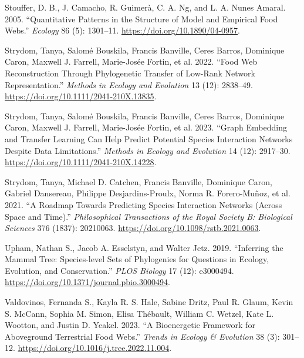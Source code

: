 \documentclass[
  letterpaper,
  DIV=11,
  numbers=noendperiod]{scrartcl}
\newlength{\cslhangindent}
\newenvironment{CSLReferences}[2] %
 {\begin{list}{}{%
  \setlength{\itemindent}{0pt}
  \setlength{\leftmargin}{0pt}
  \setlength{\parsep}{0pt}
  \ifodd #1
   \setlength{\leftmargin}{\cslhangindent}
   \setlength{\itemindent}{-1\cslhangindent}
  \fi
  \setlength{\itemsep}{#2\baselineskip}}}
 {\end{list}}
\begin{document}
\begin{CSLReferences}{1}{0}
Stouffer, D. B., J. Camacho, R. Guimerà, C. A. Ng, and L. A. Nunes
Amaral. 2005. {``Quantitative {Patterns} in the {Structure} of {Model}
and {Empirical Food Webs}.''} \emph{Ecology} 86 (5): 1301--11.
\url{https://doi.org/10.1890/04-0957}.

Strydom, Tanya, Salomé Bouskila, Francis Banville, Ceres Barros,
Dominique Caron, Maxwell J. Farrell, Marie-Josée Fortin, et al. 2022.
{``Food Web Reconstruction Through Phylogenetic Transfer of Low-Rank
Network Representation.''} \emph{Methods in Ecology and Evolution} 13
(12): 2838--49. \url{https://doi.org/10.1111/2041-210X.13835}.

Strydom, Tanya, Salomé Bouskila, Francis Banville, Ceres Barros,
Dominique Caron, Maxwell J. Farrell, Marie-Josée Fortin, et al. 2023.
{``Graph Embedding and Transfer Learning Can Help Predict Potential
Species Interaction Networks Despite Data Limitations.''} \emph{Methods
in Ecology and Evolution} 14 (12): 2917--30.
\url{https://doi.org/10.1111/2041-210X.14228}.

Strydom, Tanya, Michael D. Catchen, Francis Banville, Dominique Caron,
Gabriel Dansereau, Philippe Desjardins-Proulx, Norma R. Forero-Muñoz, et
al. 2021. {``A Roadmap Towards Predicting Species Interaction Networks
(Across Space and Time).''} \emph{Philosophical Transactions of the
Royal Society B: Biological Sciences} 376 (1837): 20210063.
\url{https://doi.org/10.1098/rstb.2021.0063}.

Upham, Nathan S., Jacob A. Esselstyn, and Walter Jetz. 2019.
{``Inferring the Mammal Tree: {Species-level} Sets of Phylogenies for
Questions in Ecology, Evolution, and Conservation.''} \emph{PLOS
Biology} 17 (12): e3000494.
\url{https://doi.org/10.1371/journal.pbio.3000494}.

Valdovinos, Fernanda S., Kayla R. S. Hale, Sabine Dritz, Paul R. Glaum,
Kevin S. McCann, Sophia M. Simon, Elisa Thébault, William C. Wetzel,
Kate L. Wootton, and Justin D. Yeakel. 2023. {``A Bioenergetic Framework
for Aboveground Terrestrial Food Webs.''} \emph{Trends in Ecology \&
Evolution} 38 (3): 301--12.
\url{https://doi.org/10.1016/j.tree.2022.11.004}.


\end{CSLReferences}
\end{document}

